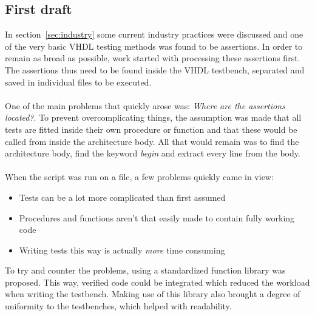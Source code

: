 \documentclass[11pt,british]{article}
\begin{document}
\subsection{First draft}
\label{subsec:first}
In section~\ref{sec:industry} some current industry practices were discussed and one of the very basic VHDL testing methods was found to be assertions. In order to remain as broad as possible, work started with processing these assertions first. The assertions thus need to be found inside the VHDL testbench, separated and saved in individual files to be executed.\\
\\
One of the main problems that quickly arose was: \emph{Where are the assertions located?}. To prevent overcomplicating things, the assumption was made that all tests are fitted inside their own procedure or function and that these would be called from inside the architecture body. All that would remain was to find the architecture body, find the keyword \emph{begin} and extract every line from the body.\\
\\
When the script was run on a file, a few problems quickly came in view:
\begin{itemize}
\item Tests can be a lot more complicated than first assumed
\item Procedures and functions aren't that easily made to contain fully working code
\item Writing tests this way is actually \emph{more} time consuming
\end{itemize}
To try and counter the problems, using a standardized function library was proposed. This way, verified code could be integrated which reduced the workload when writing the testbench. Making use of this library also brought a degree of uniformity to the testbenches, which helped with readability.

\newpage{}
\end{document}
